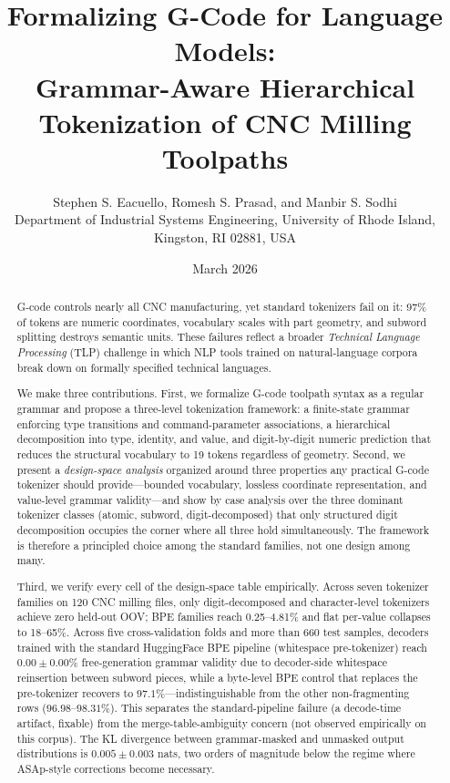 \documentclass[11pt]{article}
\begin{document}
\title{Formalizing G-Code for Language Models:\\Grammar-Aware Hierarchical Tokenization of CNC Milling Toolpaths}

\author{
Stephen S. Eacuello, Romesh S. Prasad, and Manbir S. Sodhi\\[4pt]
\small Department of Industrial Systems Engineering, University of Rhode Island, Kingston, RI 02881, USA
}
\date{March 2026}

\maketitle

\begin{abstract}
G-code controls nearly all CNC manufacturing, yet standard tokenizers fail on it: 97\% of tokens are numeric coordinates, vocabulary scales with part geometry, and subword splitting destroys semantic units. These failures reflect a broader \emph{Technical Language Processing} (TLP) challenge in which NLP tools trained on natural-language corpora break down on formally specified technical languages.

We make three contributions. First, we formalize G-code toolpath syntax as a regular grammar and propose a three-level tokenization framework: a finite-state grammar enforcing type transitions and command-parameter associations, a hierarchical decomposition into type, identity, and value, and digit-by-digit numeric prediction that reduces the structural vocabulary to 19 tokens regardless of geometry. Second, we present a \emph{design-space analysis} organized around three properties any practical G-code tokenizer should provide---bounded vocabulary, lossless coordinate representation, and value-level grammar validity---and show by case analysis over the three dominant tokenizer classes (atomic, subword, digit-decomposed) that only structured digit decomposition occupies the corner where all three hold simultaneously. The framework is therefore a principled choice among the standard families, not one design among many.

Third, we verify every cell of the design-space table empirically. Across seven tokenizer families on 120 CNC milling files, only digit-decomposed and character-level tokenizers achieve zero held-out OOV; BPE families reach 0.25--4.81\% and flat per-value collapses to 18--65\%. Across five cross-validation folds and more than 660 test samples, decoders trained with the standard HuggingFace BPE pipeline (whitespace pre-tokenizer) reach $0.00 \pm 0.00\%$ free-generation grammar validity due to decoder-side whitespace reinsertion between subword pieces, while a byte-level BPE control that replaces the pre-tokenizer recovers to $97.1\%$---indistinguishable from the other non-fragmenting rows ($96.98$--$98.31\%$). This separates the standard-pipeline failure (a decode-time artifact, fixable) from the merge-table-ambiguity concern (not observed empirically on this corpus). The KL divergence between grammar-masked and unmasked output distributions is $0.005 \pm 0.003$ nats, two orders of magnitude below the regime where ASAp-style corrections become necessary.


\end{abstract}
\end{document}
